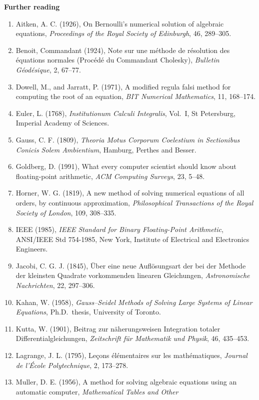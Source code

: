 \documentclass[11pt,a4paper]{article}
\numberwithin{equation}{section}
\theoremstyle{definition}
\newcommand{\subhead}[1]{%
  \par\medskip\noindent\textbf{#1}\par\nobreak\smallskip}
\begin{document}
\subhead{Further reading}
\sloppy
\begin{enumerate}
\item Aitken, A. C. (1926), On Bernoulli's numerical solution of algebraic equations, \emph{Proceedings of the Royal Society
of Edinburgh}, 46, 289--305.
\item Benoit, Commandant (1924), Note sur une m\'ethode de r\'esolution des \'equations normales (Proc\'ed\'e du Commandant
Cholesky), \emph{Bulletin G\'eod\'esique}, 2, 67--77.
\item Dowell, M., and Jarratt, P. (1971), A modified regula falsi method for computing the root of an equation, \emph{BIT
Numerical Mathematics}, 11, 168--174.
\item Euler, L. (1768), \emph{Institutionum Calculi Integralis}, Vol.~I, St Petersburg, Imperial Academy of Sciences.
\item Gauss, C. F. (1809), \emph{Theoria Motus Corporum Coelestium in Sectionibus Conicis Solem Ambientium}, Hamburg, Perthes
and Besser.
\item Goldberg, D. (1991), What every computer scientist should know about floating-point arithmetic, \emph{ACM Computing Surveys}, 23,
5--48.
\item Horner, W. G. (1819), A new method of solving numerical equations of all orders, by continuous approximation,
\emph{Philosophical Transactions of the Royal Society of London}, 109, 308--335.
\item IEEE (1985), \emph{IEEE Standard for Binary Floating-Point Arithmetic}, ANSI/IEEE Std 754-1985, New York, Institute of Electrical
and Electronics Engineers.
\item Jacobi, C. G. J. (1845), \"Uber eine neue Aufl\"osungsart der bei der Methode der kleinsten Quadrate vorkommenden
linearen Gleichungen, \emph{Astronomische Nachrichten}, 22, 297--306.
\item Kahan, W. (1958), \emph{Gauss--Seidel Methods of Solving Large Systems of Linear Equations}, Ph.D.\ thesis, University of
Toronto.
\item Kutta, W. (1901), Beitrag zur n\"aherungsweisen Integration totaler Differentialgleichungen, \emph{Zeitschrift f\"ur Mathematik und
Physik}, 46, 435--453.
\item Lagrange, J. L. (1795), Le\c{c}ons \'el\'ementaires sur les math\'ematiques, \emph{Journal de l'\'Ecole Polytechnique}, 2, 173--278.
\item Muller, D. E. (1956), A method for solving algebraic equations using an automatic computer, \emph{Mathematical Tables and Other
}
\end{enumerate}
\end{document}
